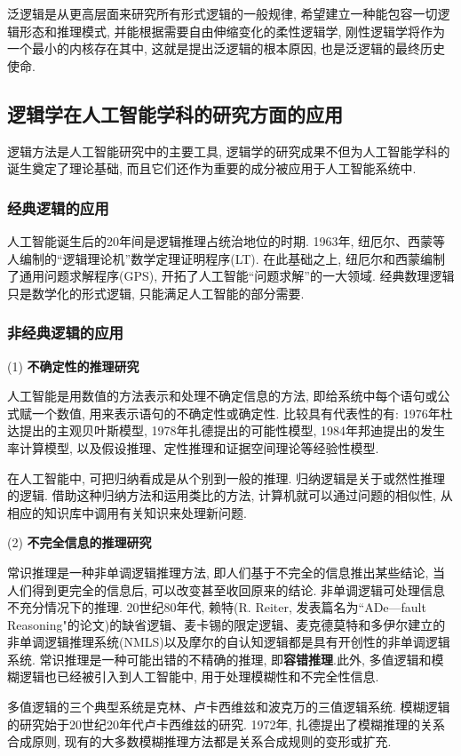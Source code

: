 泛逻辑是从更高层面来研究所有形式逻辑的一般规律, 希望建立一种能包容一切逻辑形态和推理模式, 并能根据需要自由伸缩变化的柔性逻辑学, 刚性逻辑学将作为一个最小的内核存在其中, 这就是提出泛逻辑的根本原因, 也是泛逻辑的最终历史使命.
\subsection{逻辑学在人工智能学科的研究方面的应用}

逻辑方法是人工智能研究中的主要工具, 逻辑学的研究成果不但为人工智能学科的诞生奠定了理论基础, 而且它们还作为重要的成分被应用于人工智能系统中.
\subsubsection{经典逻辑的应用}

人工智能诞生后的20年间是逻辑推理占统治地位的时期. 1963年, 纽厄尔、西蒙等人编制的“逻辑理论机”数学定理证明程序(LT). 在此基础之上, 纽厄尔和西蒙编制了通用问题求解程序(GPS), 开拓了人工智能“问题求解”的一大领域. 经典数理逻辑只是数学化的形式逻辑, 只能满足人工智能的部分需要.
\subsubsection{非经典逻辑的应用}

(1) \textbf{不确定性的推理研究}

人工智能是用数值的方法表示和处理不确定信息的方法, 即给系统中每个语句或公式赋一个数值, 用来表示语句的不确定性或确定性. 比较具有代表性的有: 1976年杜达提出的主观贝叶斯模型, 1978年扎德提出的可能性模型, 1984年邦迪提出的发生率计算模型, 以及假设推理、定性推理和证据空间理论等经验性模型.

在人工智能中, 可把归纳看成是从个别到一般的推理. 归纳逻辑是关于或然性推理的逻辑.
借助这种归纳方法和运用类比的方法, 计算机就可以通过问题的相似性, 从相应的知识库中调用有关知识来处理新问题.

(2) \textbf{不完全信息的推理研究}

常识推理是一种非单调逻辑推理方法, 即人们基于不完全的信息推出某些结论, 当人们得到更完全的信息后, 可以改变甚至收回原来的结论. 非单调逻辑可处理信息不充分情况下的推理.
20世纪80年代, 赖特(R. Reiter, 发表篇名为``ADe—fault  Reasoning"的论文)的缺省逻辑、麦卡锡的限定逻辑、麦克德莫特和多伊尔建立的非单调逻辑推理系统(NMLS)以及摩尔的自认知逻辑都是具有开创性的非单调逻辑系统.
常识推理是一种可能出错的不精确的推理, 即\textbf{容错推理}.此外, 多值逻辑和模糊逻辑也已经被引入到人工智能中, 用于处理模糊性和不完全性信息. 
\begin{remark}
    多值逻辑的三个典型系统是克林、卢卡西维兹和波克万的三值逻辑系统. 模糊逻辑的研究始于20世纪20年代卢卡西维兹的研究. 1972年, 扎德提出了模糊推理的关系合成原则, 现有的大多数模糊推理方法都是关系合成规则的变形或扩充.
\end{remark}
